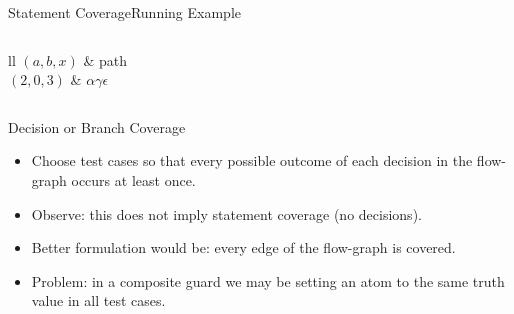 \begin{Frame}{Statement Coverage}{Running Example}
  \begin{columns}
		\begin{center}
	     \begin{zebratabular}{ll}
	       \headerrow $(a,b,x)$ & path \\
	       \alert<1>{$(2, 0, 3)$} & \alert<1>{$\alpha\gamma\epsilon$} \\
	    \end{zebratabular}
		\end{center}
  \end{columns}
\end{Frame}

\begin{Frame}{Decision or Branch Coverage}
  \begin{itemize} 
    \item Choose test cases so that every possible outcome of each decision in the flow-graph occurs at least once.
    \item \alert{Observe:} this does not imply statement coverage (no decisions).
    \item Better formulation would be: every edge of the flow-graph is covered.
    \item \alert{Problem}: in a composite guard we may be setting an atom to the same truth value in all test cases.
  \end{itemize}
\end{Frame}

